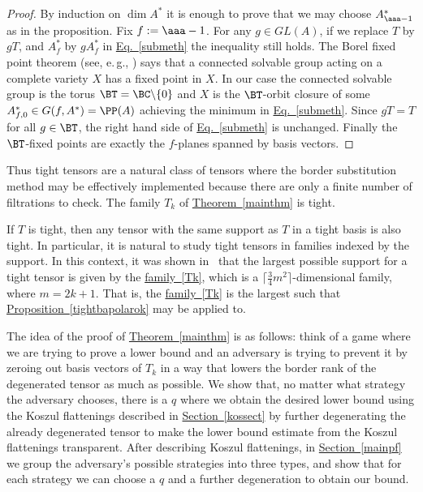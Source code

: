 \documentclass[11pt]{article}
\newcommand{\expref}[2]{\texorpdfstring{\hyperref[#2]{#1~\ref{#2}}}{#1~\ref{#2}}}
\newcommand{\expeqref}[2]{\texorpdfstring{\hyperref[#2]{#1~\eqref{#2}}}{#1~\eqref{#2}}}
\newcommand{\eg}{e.\,g.}
\begin{document}
\begin{proof} 
By induction on $\dim A^*$ it is enough to prove that we may choose $A_{\aaa-1}^*$ as in the proposition.
Fix $f:=\aaa-1$. For any $g\in GL(A)$,
if we replace $T$ by $gT$, and $A_f^*$ by $gA_f^*$  in \expeqref{Eq.}{submeth} 
the inequality still holds.
The Borel fixed point theorem (see, \eg, \cite[\S 21.2]{MR0396773}) says that a connected
solvable group acting on a complete variety $X$ has a fixed point in $X$. In our case the 
connected solvable
group is the torus $\BT=\BC\backslash\{0\}$ and $X$ is the $\BT$-orbit closure
of some $A^*_{f,0}\in G(f,A^*)=\PP(A)$ achieving the minimum in \expeqref{Eq.}{submeth}.
Since $gT=T$ for all $g\in \BT$, the right hand side of \expeqref{Eq.}{submeth} is
unchanged. Finally  the $\BT$-fixed points are exactly the $f$-planes spanned
by basis vectors.  
\end{proof}

Thus tight tensors are a natural class of tensors where the border substitution method may
be
effectively implemented because there are only a finite number of filtrations to check.
The family $T_k$ of %
\expref{Theorem}{mainthm} is tight.

If $T$ is tight, then any tensor with the same support as $T$ in a tight basis is also tight. In particular, it
is natural to study tight tensors in families indexed by the support. In this context, 
it was shown in~\cite{MR4204580} that the largest possible  support  
for a tight tensor is given by the   \expeqref{family}{Tk},  
which  is a $\lceil \frac 34 m^2\rceil$-dimensional
family, where $m=2k+1$. That is, the \expeqref{family}{Tk}
is the largest such
that \expref{Proposition}{tightbapolarok} may be applied to.

The idea of the proof of \expref{Theorem}{mainthm} is as follows: think of a game where we are trying to
prove a lower bound and an adversary is trying to prevent it by zeroing out basis vectors
of $T_k$ in a way that lowers the border rank  of the degenerated tensor as much as possible. We show that, no matter
what strategy the adversary chooses, there is a $q$ where we obtain the desired lower bound
using the Koszul flattenings described in
%
\expref{Section}{kossect}  %
by further degenerating the already degenerated
tensor to make the lower bound estimate from the Koszul flattenings transparent.  
After describing   Koszul
flattenings, in %
\expref{Section}{mainpf}  %
we group the adversary's possible strategies into three types, and show
that  for each
strategy we can choose a $q$ and a further degeneration to obtain our bound.
\end{document}
